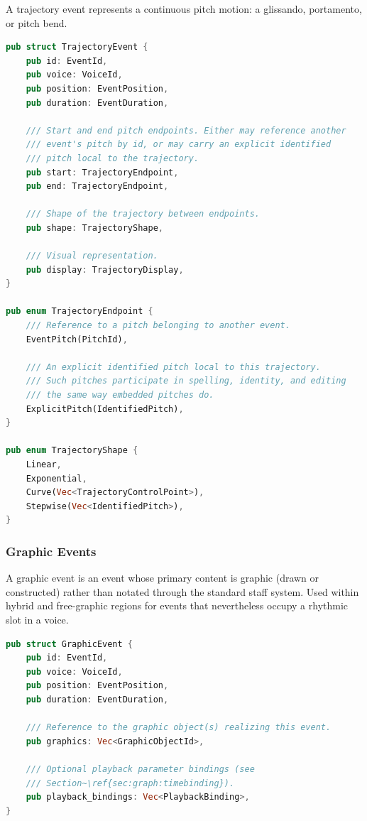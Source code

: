 \documentclass[11pt,letterpaper]{report}
\begin{document}
A trajectory event represents a continuous pitch motion: a glissando,
portamento, or pitch bend.

\begin{lstlisting}[language=Rust]
pub struct TrajectoryEvent {
    pub id: EventId,
    pub voice: VoiceId,
    pub position: EventPosition,
    pub duration: EventDuration,

    /// Start and end pitch endpoints. Either may reference another
    /// event's pitch by id, or may carry an explicit identified
    /// pitch local to the trajectory.
    pub start: TrajectoryEndpoint,
    pub end: TrajectoryEndpoint,

    /// Shape of the trajectory between endpoints.
    pub shape: TrajectoryShape,

    /// Visual representation.
    pub display: TrajectoryDisplay,
}

pub enum TrajectoryEndpoint {
    /// Reference to a pitch belonging to another event.
    EventPitch(PitchId),

    /// An explicit identified pitch local to this trajectory.
    /// Such pitches participate in spelling, identity, and editing
    /// the same way embedded pitches do.
    ExplicitPitch(IdentifiedPitch),
}

pub enum TrajectoryShape {
    Linear,
    Exponential,
    Curve(Vec<TrajectoryControlPoint>),
    Stepwise(Vec<IdentifiedPitch>),
}
\end{lstlisting}

\subsubsection{Graphic Events}

A graphic event is an event whose primary content is graphic (drawn
or constructed) rather than notated through the standard staff system.
Used within hybrid and free-graphic regions for events that nevertheless
occupy a rhythmic slot in a voice.

\begin{lstlisting}[language=Rust]
pub struct GraphicEvent {
    pub id: EventId,
    pub voice: VoiceId,
    pub position: EventPosition,
    pub duration: EventDuration,

    /// Reference to the graphic object(s) realizing this event.
    pub graphics: Vec<GraphicObjectId>,

    /// Optional playback parameter bindings (see
    /// Section~\ref{sec:graph:timebinding}).
    pub playback_bindings: Vec<PlaybackBinding>,
}
\end{lstlisting}
\end{document}
